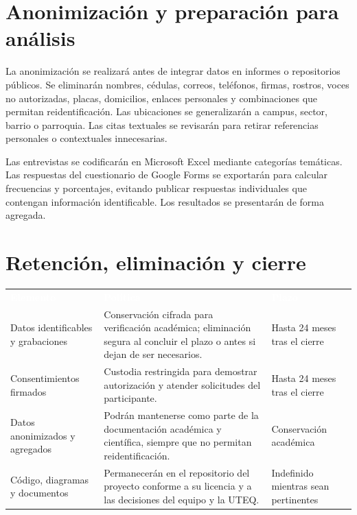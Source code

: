 \documentclass[10pt,a4paper]{article}
\begin{document}
\section{Anonimización y preparación para análisis}

La anonimización se realizará antes de integrar datos en informes o repositorios públicos. Se eliminarán nombres, cédulas, correos, teléfonos, firmas, rostros, voces no autorizadas, placas, domicilios, enlaces personales y combinaciones que permitan reidentificación. Las ubicaciones se generalizarán a campus, sector, barrio o parroquia. Las citas textuales se revisarán para retirar referencias personales o contextuales innecesarias.

Las entrevistas se codificarán en Microsoft Excel mediante categorías temáticas. Las respuestas del cuestionario de Google Forms se exportarán para calcular frecuencias y porcentajes, evitando publicar respuestas individuales que contengan información identificable. Los resultados se presentarán de forma agregada.

\section{Retención, eliminación y cierre}

\noindent\begin{tabularx}{\textwidth}{@{}L{4.0cm} J L{2.75cm}@{}}
\textcolor{white}{\textbf{Elemento}} &
\textcolor{white}{\textbf{Política}} &
\textcolor{white}{\textbf{Plazo}}\\
Datos identificables y grabaciones & Conservación cifrada para verificación académica; eliminación segura al concluir el plazo o antes si dejan de ser necesarios. & Hasta 24 meses tras el cierre\\
Consentimientos firmados & Custodia restringida para demostrar autorización y atender solicitudes del participante. & Hasta 24 meses tras el cierre\\
Datos anonimizados y agregados & Podrán mantenerse como parte de la documentación académica y científica, siempre que no permitan reidentificación. & Conservación académica\\
Código, diagramas y documentos & Permanecerán en el repositorio del proyecto conforme a su licencia y a las decisiones del equipo y la UTEQ. & Indefinido mientras sean pertinentes\\
\end{tabularx}
\end{document}
